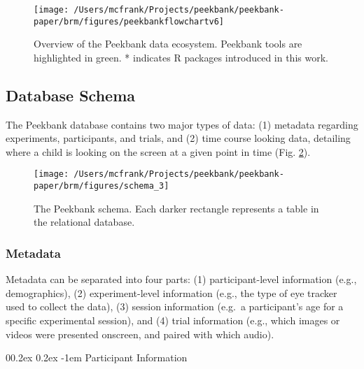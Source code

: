 \documentclass[
  english,
  man,floatsintext]{apa6}
\makeatletter
\let\oldparagraph\paragraph
\renewcommand{\paragraph}[1]{\oldparagraph{#1}\mbox{}}
\renewcommand{\paragraph}{\@startsection{paragraph}{4}{\parindent}%
  {0\baselineskip \@plus 0.2ex \@minus 0.2ex}%
  {-1em}%
  {\normalfont\normalsize\bfseries\itshape\typesectitle}}
\makeatother
\begin{document}
\begin{figure}

{\centering \texttt{[image: /Users/mcfrank/Projects/peekbank/peekbank-paper/brm/figures/peekbankflowchartv6]} 

}

\caption{Overview of the Peekbank data ecosystem. Peekbank tools are highlighted in green. * indicates R packages introduced in this work.}\label{fig:fig-framework-overview}
\end{figure}

\hypertarget{database-schema}{%
\subsection{Database Schema}\label{database-schema}}

The Peekbank database contains two major types of data: (1) metadata regarding experiments, participants, and trials, and (2) time course looking data, detailing where a child is looking on the screen at a given point in time (Fig. \ref{fig:fig-schema}).

\begin{figure}

{\centering \texttt{[image: /Users/mcfrank/Projects/peekbank/peekbank-paper/brm/figures/schema\_3]} 

}

\caption{The Peekbank schema. Each darker rectangle represents a table in the relational database.}\label{fig:fig-schema}
\end{figure}

\hypertarget{metadata}{%
\subsubsection{Metadata}\label{metadata}}

Metadata can be separated into four parts: (1) participant-level information (e.g., demographics), (2) experiment-level information (e.g., the type of eye tracker used to collect the data), (3) session information (e.g.~a participant's age for a specific experimental session), and (4) trial information (e.g., which images or videos were presented onscreen, and paired with which audio).

\hypertarget{participant-information}{%
\paragraph{Participant Information}\label{participant-information}}
\end{document}
